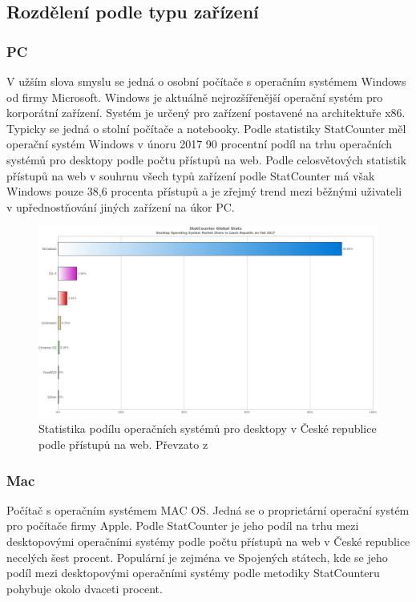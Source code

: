  \subsection{Rozdělení podle typu zařízení}
 \subsubsection{PC}
 V užším slova smyslu se jedná o osobní počítače s operačním systémem Windows od firmy Microsoft. Windows je aktuálně nejrozšířenější operační systém pro korporátní zařízení. Systém je určený pro zařízení postavené na architektuře x86. Typicky se jedná o stolní počítače a notebooky. Podle statistiky StatCounter měl operační systém Windows v únoru 2017 90 procentní podíl na trhu operačních systémů pro desktopy podle počtu přístupů na web. Podle celosvětových statistik přístupů na web v souhrnu všech typů zařízení podle StatCounter má však Windows pouze 38,6 procenta přístupů a je zřejmý trend mezi běžnými uživateli v upřednostňování jiných zařízení na úkor PC.  
 
\begin{figure}[h]
\includegraphics[width=13cm]{img/StatCounter_Desktop}
\caption{Statistika podílu operačních systémů pro desktopy v České republice podle přístupů na web. Převzato z \cite{http://gs.statcounter.com/os-market-share/mobile-tablet/czech-republic/}} 
\centering
\end{figure}
 
 
 
 \subsubsection{Mac}
 Počítač s operačním systémem MAC OS. Jedná se o proprietární operační systém pro počítače firmy Apple. Podle StatCounter je jeho podíl na trhu mezi desktopovými operačními systémy podle počtu přístupů na web v České republice necelých šest procent. Populární je zejména ve Spojených státech, kde se jeho podíl mezi desktopovými operačními systémy podle metodiky StatCounteru pohybuje okolo dvaceti procent.
 
